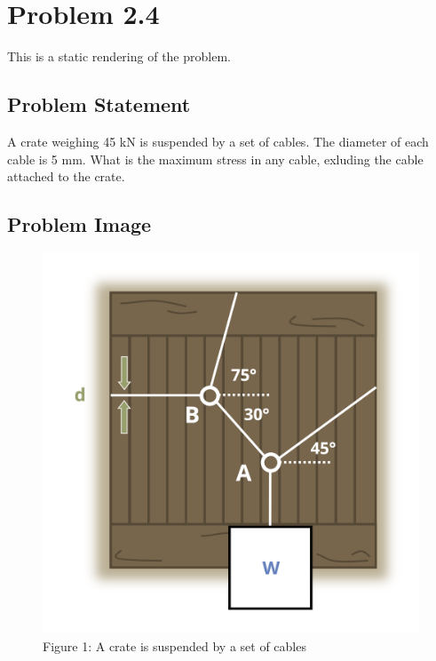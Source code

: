 \documentclass[
  letterpaper,
  DIV=11,
  numbers=noendperiod]{scrreprt}
\begin{document}
\chapter*{Problem 2.4}\label{problem-2.4-1}


This is a static rendering of the problem.

\section*{Problem Statement}\label{problem-statement-3}


A crate weighing 45 kN is suspended by a set of cables. The diameter of
each cable is 5 mm. What is the maximum stress in any cable, exluding
the cable attached to the crate.

\section*{Problem Image}\label{problem-image-13}


\begin{figure}[H]

{\centering \includegraphics{images/146.png}

}

\caption{Figure 1: A crate is suspended by a set of cables}

\end{figure}%
\end{document}
